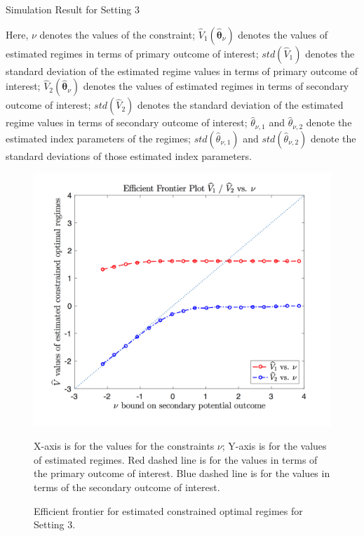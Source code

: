 \documentclass{article}
\newcommand{\wh}{\widehat}
\newcommand{\bs}{ \boldsymbol}
\begin{document}
\begin{appendices}
\begin{figure}[!htb]
\end{figure}
\begin{table}[!htbp]
	\caption {Simulation Result for Setting 3}
	\centering
	{\tt
		
	}
	\justify
	Here, $\nu$ denotes the values of the constraint; $\wh{V}_1(\wh{\bs{\theta}}_{\nu})$ denotes the values of estimated regimes in terms of primary outcome of interest; $std(\wh{V}_1)$ denotes the standard deviation of the estimated regime values in terms of primary outcome of interest; $\wh{V}_2(\wh{\bs{\theta}}_{\nu})$ denotes the values of estimated regimes in terms of secondary outcome of interest; $std(\wh{V}_2)$ denotes the standard deviation of the estimated regime values in terms of secondary outcome of interest; $\wh{\theta}_{\nu,1}$ and $\wh{\theta}_{\nu,2}$ denote the estimated index parameters of the regimes; $std(\wh{\theta}_{\nu,1})$ and $std(\wh{\theta}_{\nu,2})$ denote the standard deviations of those estimated index parameters.	
\end{table} 
\begin{figure}[!htb]
	\centering
	\includegraphics[width=.9\linewidth]{./figs/efficient_plot3.png}
	\caption{Efficient frontier for estimated constrained optimal regimes for Setting 3.}
	\label{fig:3}
	\justify
X-axis is for the values for the constraints $\nu$; Y-axis is for the values of estimated regimes. Red dashed line is for the values in terms of the primary outcome of interest. Blue dashed line is for the values in terms of the secondary outcome of interest.
\end{figure}
\begin{table}[!htbp]

\end{table}
\end{appendices}
\end{document}
